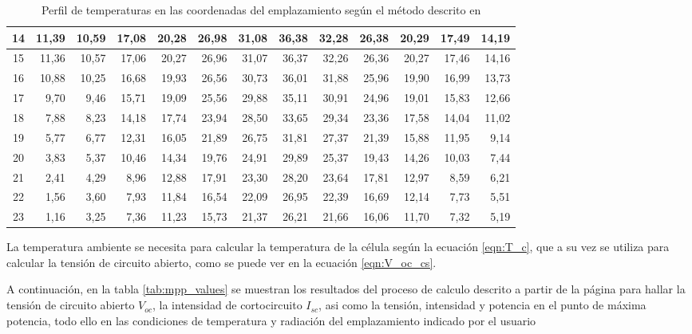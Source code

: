 \begin{table}[H]
\begin{tabular}{|c|r|r|r|r|r|r|r|r|r|r|r|r|}
14 & 11,39 & 10,59 & 17,08 & 20,28 & 26,98 & 31,08 & 36,38 & 32,28 & 26,38 & 20,29 & 17,49 & 14,19 \\ \hline
15 & 11,36 & 10,57 & 17,06 & 20,27 & 26,96 & 31,07 & 36,37 & 32,26 & 26,36 & 20,27 & 17,46 & 14,16 \\ \hline
16 & 10,88 & 10,25 & 16,68 & 19,93 & 26,56 & 30,73 & 36,01 & 31,88 & 25,96 & 19,90 & 16,99 & 13,73 \\ \hline
17 & 9,70  & 9,46  & 15,71 & 19,09 & 25,56 & 29,88 & 35,11 & 30,91 & 24,96 & 19,01 & 15,83 & 12,66 \\ \hline
18 & 7,88  & 8,23  & 14,18 & 17,74 & 23,94 & 28,50 & 33,65 & 29,34 & 23,36 & 17,58 & 14,04 & 11,02 \\ \hline
19 & 5,77  & 6,77  & 12,31 & 16,05 & 21,89 & 26,75 & 31,81 & 27,37 & 21,39 & 15,88 & 11,95 & 9,14  \\ \hline
20 & 3,83  & 5,37  & 10,46 & 14,34 & 19,76 & 24,91 & 29,89 & 25,37 & 19,43 & 14,26 & 10,03 & 7,44  \\ \hline
21 & 2,41  & 4,29  & 8,96  & 12,88 & 17,91 & 23,30 & 28,20 & 23,64 & 17,81 & 12,97 & 8,59  & 6,21  \\ \hline
22 & 1,56  & 3,60  & 7,93  & 11,84 & 16,54 & 22,09 & 26,95 & 22,39 & 16,69 & 12,14 & 7,73  & 5,51  \\ \hline
23 & 1,16  & 3,25  & 7,36  & 11,23 & 15,73 & 21,37 & 26,21 & 21,66 & 16,06 & 11,70 & 7,32  & 5,19  \\ \hline
\end{tabular}
\caption{Perfil de temperaturas en las coordenadas del emplazamiento según el método descrito en \cite{temp_paper} \label{tab:temp_profiles}}
\end{table}

La temperatura ambiente se necesita para calcular la temperatura de la célula según la ecuación \ref{eqn:T_c}, que a su vez se utiliza para calcular la tensión de circuito abierto, como se puede ver en la ecuación \ref{eqn:V_oc_cs}.

A continuación, en la tabla \ref{tab:mpp_values} se muestran los resultados del proceso de calculo descrito a partir de la página \pageref{section:var_form_factor} para hallar la tensión de circuito abierto $V_{oc}$, la intensidad de cortocircuito $I_{sc}$, asi como la tensión, intensidad y potencia en el punto de máxima potencia, todo ello en las condiciones de temperatura y radiación del emplazamiento indicado por el usuario

